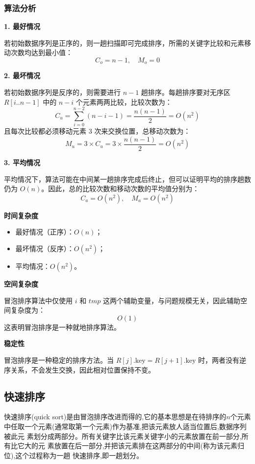 \documentclass[lang=cn,newtx,10pt,scheme=chinese]{elegantbook}
\begin{document}
\subsubsection{算法分析}

\textbf{1. 最好情况  }

   若初始数据序列是正序的，则一趟扫描即可完成排序，所需的关键字比较和元素移动次数均达到最小值：
   \[
   C_o = n - 1, \quad M_o = 0
   \]

\textbf{2. 最坏情况  }

   若初始数据序列是反序的，则需要进行 $n - 1$ 趟排序。每趟排序要对无序区 $R[i..n-1]$ 中的 $n - i$ 个元素两两比较，比较次数为：
   \[
   C_u = \sum_{i=0}^{n-2} (n - i - 1) = \frac{n(n-1)}{2} = O(n^2)
   \]
   且每次比较都必须移动元素 3 次来交换位置，总移动次数为：
   \[
   M_u = 3 \times C_u = 3 \times \frac{n(n-1)}{2} = O(n^2)
   \]

  \textbf{3. 平均情况  }

   平均情况下，算法可能在中间某一趟排序完成后终止，但可以证明平均的排序趟数仍为 $O(n)$。因此，总的比较次数和移动次数的平均值分别为：
   \[
   C_a = O(n^2), \quad M_a = O(n^2)
   \]

\textbf{时间复杂度 }

\begin{itemize}
  \item 最好情况（正序）：$O(n)$；
  \item 最坏情况（反序）：$O(n^2)$；
  \item 平均情况：$O(n^2)$。
\end{itemize}

\textbf{空间复杂度 } 

冒泡排序算法中仅使用 $i$ 和 $tmp$ 这两个辅助变量，与问题规模无关，因此辅助空间复杂度为：
\[
O(1)
\]
这表明冒泡排序是一种就地排序算法。

\textbf{稳定性 }  

冒泡排序是一种稳定的排序方法。当 $R[j].\text{key} = R[j+1].\text{key}$ 时，两者没有逆序关系，不会发生交换，因此相对位置保持不变。


\subsection{快速排序}

 

快速排序(quick sort)是由冒泡排序改进而得的,它的基本思想是在待排序的$n$个元素
中任取一个元素(通常取第一个元素)作为基准,把该元素放人适当位置后,数据序列被此元
素划分成两部分。所有关键字比该元素关键字小的元素放置在前一部分,所有比它大的元
素放置在后一部分,并把该元素排在这两部分的中间(称为该元素归位),这个过程称为一趟
快速排序,即一趟划分。
\end{document}
